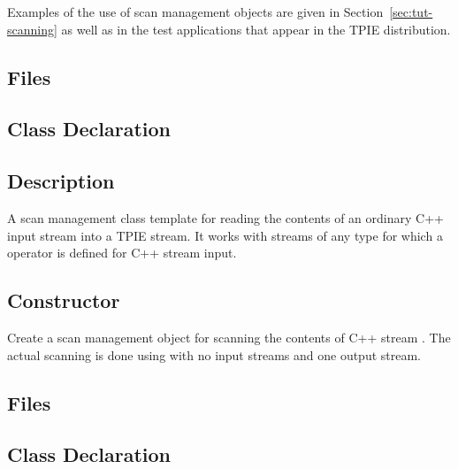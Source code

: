 
Examples of the use of scan management objects are given in
Section~\ref{sec:tut-scanning} as well as in the test applications that
appear in the TPIE distribution.




\subsection{Files}
  \btabb
     {}
  \etabb


\subsection{Class Declaration}
  \btabb
     {}
  \etabb

\subsection{Description}
A scan management class template for reading the contents of an
ordinary C++ input stream into a TPIE stream.  It works with
streams of any type for which a \myverb{>>} operator is defined for C++
stream input.

\subsection{Constructor}
  \btabb
     {Create a
scan management object for scanning the contents of C++ stream
. The actual scanning is done using  with
no input streams and one output stream.}
  \etabb



\subsection{Files}
  \btabb
     {}
  \etabb


\subsection{Class Declaration}
  \btabb
     {}
  \etabb

